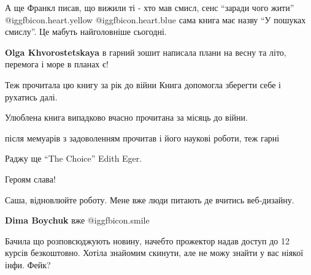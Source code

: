  
 
 
 
 
\zzSecCmt

\begin{itemize} %

А ще Франкл писав, що вижили ті - хто мав смисл, сенс \enquote{заради чого
жити}  @igg{fbicon.heart.yellow}  @igg{fbicon.heart.blue}  сама книга має назву \enquote{У пошуках смислу}. Це мабуть
найголовніше сьогодні.

\textbf{Olga Khvorostetskaya} в гарний зошит написала плани на весну та літо, перемога і море в планах є!


Теж прочитала цю книгу за рік до війни Книга допомогла зберегти себе і рухатись
далі.

Улюблена книга випадково вчасно прочитана за місяць до війни.

\begin{itemize} %

після мемуарів з задоволенням прочитав і його наукові роботи, теж гарні

Раджу ще \enquote{The Choice} Edith Eger.
\end{itemize} %


Героям слава!

Саша, відновлюйте роботу. Мене вже люди питають де вчитись веб-дизайну.

\textbf{Dima Boychuk} вже  @igg{fbicon.smile} 


Бачила що розповсюджують новину, начебто прожектор надав доступ до 12 курсів
безкоштовно. Хотіла знайомим скинути, але не можу знайти у вас ніякої інфи.
Фейк?


\end{itemize} %
